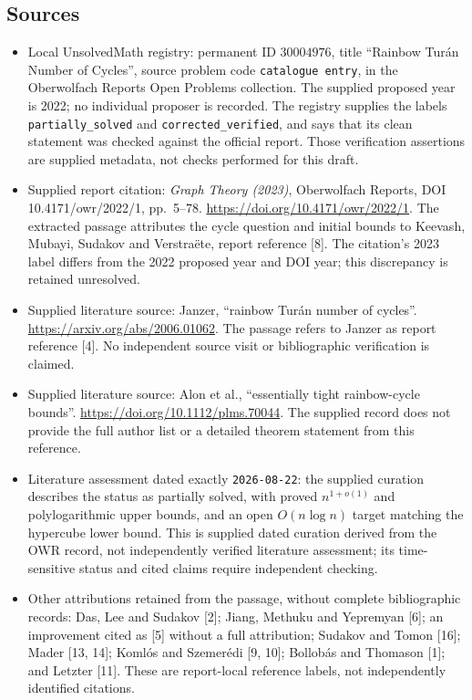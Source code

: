 \documentclass[11pt]{article}
\begin{document}
\subsection{Sources}
\begin{itemize}
\item Local UnsolvedMath registry: permanent ID \(30004976\), title ``Rainbow Turán Number of Cycles'', source problem code \texttt{catalogue entry}, in the Oberwolfach Reports Open Problems collection. The supplied proposed year is 2022; no individual proposer is recorded. The registry supplies the labels \texttt{partially\_solved} and \texttt{corrected\_verified}, and says that its clean statement was checked against the official report. Those verification assertions are supplied metadata, not checks performed for this draft.
\item Supplied report citation: \emph{Graph Theory (2023)}, Oberwolfach Reports, DOI 10.4171/owr/2022/1, pp.~5--78. \url{https://doi.org/10.4171/owr/2022/1}. The extracted passage attributes the cycle question and initial bounds to Keevash, Mubayi, Sudakov and Verstraëte, report reference [8]. The citation's 2023 label differs from the 2022 proposed year and DOI year; this discrepancy is retained unresolved.
\item Supplied literature source: Janzer, ``rainbow Turán number of cycles''. \url{https://arxiv.org/abs/2006.01062}. The passage refers to Janzer as report reference [4]. No independent source visit or bibliographic verification is claimed.
\item Supplied literature source: Alon et al., ``essentially tight rainbow-cycle bounds''. \url{https://doi.org/10.1112/plms.70044}. The supplied record does not provide the full author list or a detailed theorem statement from this reference.
\item Literature assessment dated exactly \texttt{2026-08-22}: the supplied curation describes the status as partially solved, with proved \(n^{1+o(1)}\) and polylogarithmic upper bounds, and an open \(O(n\log n)\) target matching the hypercube lower bound. This is supplied dated curation derived from the OWR record, not independently verified literature assessment; its time-sensitive status and cited claims require independent checking.
\item Other attributions retained from the passage, without complete bibliographic records: Das, Lee and Sudakov [2]; Jiang, Methuku and Yepremyan [6]; an improvement cited as [5] without a full attribution; Sudakov and Tomon [16]; Mader [13, 14]; Komlós and Szemerédi [9, 10]; Bollobás and Thomason [1]; and Letzter [11]. These are report-local reference labels, not independently identified citations.
\end{itemize}
\end{document}
